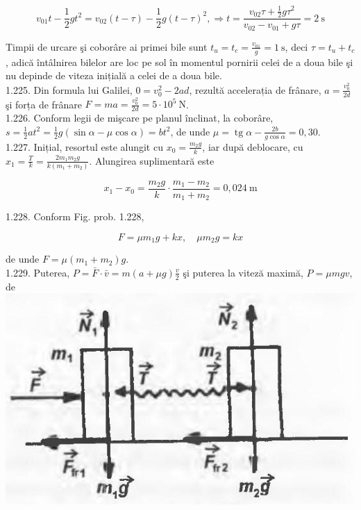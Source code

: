 \documentclass[10pt]{article}
\begin{document}
$$
v_{01} t-\frac{1}{2} g t^{2}=v_{02}(t-\tau)-\frac{1}{2} g(t-\tau)^{2}, \Rightarrow t=\frac{v_{02} \tau+\frac{1}{2} g \tau^{2}}{v_{02}-v_{01}+g \tau}=2 \mathrm{~s}
$$

Timpii de urcare şi coborâre ai primei bile sunt $t_{u}=t_{c}=\frac{v_{01}}{g}=1 \mathrm{~s}$, deci $\tau=t_{u}+t_{c}$, adică întâlnirea bilelor are loc pe sol în momentul pornirii celei de a doua bile şi nu depinde de viteza inițială a celei de a doua bile.\\
1.225. Din formula lui Galilei, $0=v_{0}^{2}-2 a d$, rezultă accelerația de frânare, $a=\frac{v_{0}^{2}}{2 d}$ şi forța de frânare $F=m a=\frac{v_{0}^{2}}{2 d}=5 \cdot 10^{5} \mathrm{~N}$.\\
1.226. Conform legii de mişcare pe planul înclinat, la coborâre, $s=\frac{1}{2} a t^{2}=\frac{1}{2} g(\sin \alpha-\mu \cos \alpha)=b t^{2}$, de unde $\mu=\operatorname{tg} \alpha-\frac{2 b}{g \cos \alpha}=0,30$.\\
1.227. Inițial, resortul este alungit cu $x_{0}=\frac{m_{2} g}{k}$, iar după deblocare, cu $x_{1}=\frac{T}{k}=\frac{2 m_{1} m_{2} g}{k\left(m_{1}+m_{2}\right)}$. Alungirea suplimentară este

$$
x_{1}-x_{0}=\frac{m_{2} g}{k} \cdot \frac{m_{1}-m_{2}}{m_{1}+m_{2}}=0,024 \mathrm{~m}
$$

1.228. Conform Fig. prob. 1.228,

$$
F=\mu m_{1} g+k x, \quad \mu m_{2} g=k x
$$

de unde $F=\mu\left(m_{1}+m_{2}\right) g$.\\
1.229. Puterea, $P=\bar{F} \cdot \bar{v}=m(a+\mu g) \frac{v}{2}$ şi puterea la viteză maximă, $P=\mu m g v$, de\\
\includegraphics[max width=\textwidth, center]{2025_07_01_5b3ff9fa0d508c8e9f17g-247}
\end{document}
